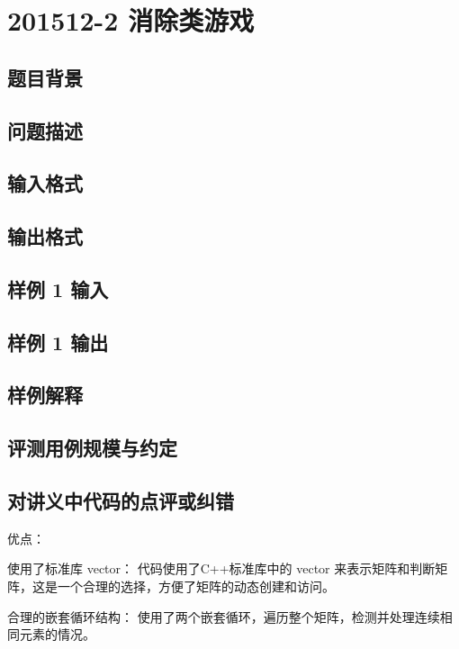 \section{201512-2 消除类游戏}

\subsection{题目背景}

\subsection{问题描述}

\subsection{输入格式}

\subsection{输出格式}

\subsection{样例 1 输入}

\subsection{样例 1 输出}

\subsection{样例解释}

\subsection{评测用例规模与约定}

\subsection{对讲义中代码的点评或纠错}
 
优点：

使用了标准库 vector： 代码使用了C++标准库中的 vector 来表示矩阵和判断矩阵，这是一个合理的选择，方便了矩阵的动态创建和访问。

合理的嵌套循环结构： 使用了两个嵌套循环，遍历整个矩阵，检测并处理连续相同元素的情况。

